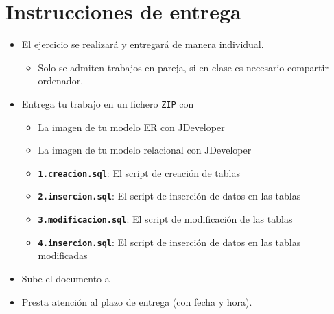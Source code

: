 \section{Instrucciones de entrega}
\begin{itemize}
\item El ejercicio se realizará y entregará de manera individual.
  \begin{itemize}
  \item Solo se admiten trabajos en pareja, si en clase es necesario compartir ordenador.
  \end{itemize}
\item Entrega tu trabajo en un fichero \texttt{ZIP} con
  \begin{itemize}
  \item La imagen de tu modelo ER  con JDeveloper
  \item La imagen de tu modelo relacional con JDeveloper
  \item \texttt{\textbf{1.creacion.sql}}: El script de creación de tablas
  \item \texttt{\textbf{2.insercion.sql}}: El script de inserción de datos en las tablas
  \item \texttt{\textbf{3.modificacion.sql}}: El script de modificación de las tablas
  \item \texttt{\textbf{4.insercion.sql}}: El script de inserción de datos en las tablas modificadas
  \end{itemize}
\item Sube el documento a 
\item Presta atención al plazo de entrega (con fecha y hora).
  
\end{itemize}





